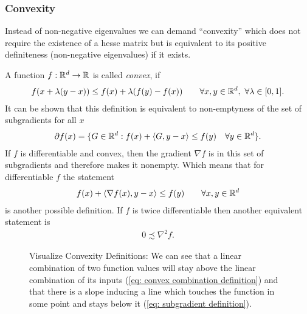 \subsubsection{Convexity}

Instead of non-negative eigenvalues we can demand ``convexity'' which does
not require the existence of a hesse matrix but is equivalent to its positive
definiteness (non-negative eigenvalues) if it exists.
%
\begin{definition}[Convexity]\label{def: convexity}
	A function \(f:\mathbb{R}^d\to \mathbb{R}\) is called \emph{convex}, if 
	\begin{align}\label{eq: convex combination definition}
		f(x + \hesseEV(y-x)) \le f(x) + \hesseEV (f(y)-f(x))
		\qquad \forall x,y\in\reals^\dimension,\ \forall\hesseEV\in[0,1].
	\end{align}
	It can be shown \parencite[e.g.][Prop. 1.1]{bubeckConvexOptimizationAlgorithms2015} that this
	definition is equivalent to non-emptyness of the set of subgradients for all \(x\)
	\begin{align}\label{eq: subgradient definition}
		\partial f(x) = \{
			G \in\mathbb{R}^d: f(x) + \langle G, y-x\rangle \le f(y)
			\quad \forall y\in\mathbb{R}^d
		\}.
	\end{align}
	If \(f\) is differentiable and convex, then the gradient \(\nabla f\) is in
	this set of subgradients \parencite[e.g.][Prop.
	1.1]{bubeckConvexOptimizationAlgorithms2015} and therefore makes it nonempty.
	Which means that for differentiable \(f\) the statement
	\begin{align*}
		f(x) + \langle\nabla f(x), y-x\rangle \le f(y)\qquad \forall x,y\in\mathbb{R}^d
	\end{align*}
	is another possible definition. If \(f\) is twice differentiable then another
	equivalent statement is \parencite[e.g.][Theorem 2.1.4]{nesterovLecturesConvexOptimization2018}
	\begin{align*}
		0\precsim\nabla^2 f.
	\end{align*}
\end{definition}
%
\begin{figure}[h]
	\centering
	\def\svgwidth{1\textwidth}
	
	\caption{
		Visualize Convexity Definitions: We can see that a linear combination
		of two function values will stay above the linear combination of its inputs
		(\ref{eq: convex combination definition}) and that there is a slope inducing
		a line which touches the function in some point and stays below it
		(\ref{eq: subgradient definition}).
	}
	\label{fig: visualize convexity definition}
\end{figure}
%
